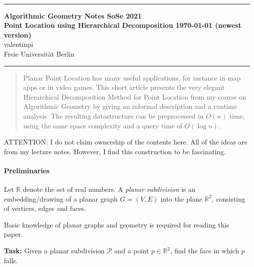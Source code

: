 \documentclass[10pt,fleqn]{article}
\theoremstyle{definition}
\theoremstyle{remark}
\newcommand{\Authors}{valentinpi}
\begin{document}
\vspace*{-12ex}
\phantom{}\\
\noindent\rule{\textwidth}{0.1pt}
\large \textbf{Algorithmic Geometry Notes \hfill SoSe 2021} \vspace*{0.25cm}\\
\normalsize \textbf{Point Location using Hierarchical Decomposition \hfill \today { (newest version)}}\\
\Authors\\
Freie Universität Berlin\\
\noindent\rule{\textwidth}{0.1pt}

\begin{abstract}
    \noindent Planar Point Location has many useful applications, for instance in map apps or in video games. This short article presents the very elegant Hierarchical Decomposition Method for Point Location from my course on Algorithmic Geometry by giving an informal description and a runtime analysis. The resulting datastructure can be preprocessed in \(O(n)\) time, using the same space complexity and a query time of \(O(\log{n})\).
\end{abstract}

\vspace{\baselineskip}

ATTENTION: I do not claim ownership of the contents here. All of the ideas are from my lecture notes. However, I find this construction to be fascinating.

\paragraph{Preliminaries} Let \(\mathbb{R}\) denote the set of real numbers. A \emph{planar subdivision} is an embedding/drawing of a planar graph \(G = (V, E)\) into the plane \(\mathbb{R}^2\), consisting of vertices, edges and faces.

Basic knowledge of planar graphs and geometry is required for reading this paper.

\vspace{\baselineskip}

\textbf{Task:} Given a planar subdivision \(\mathcal{P}\) and a point \(p \in \mathbb{R}^2\), find the face in which \(p\) falls.
\end{document}
